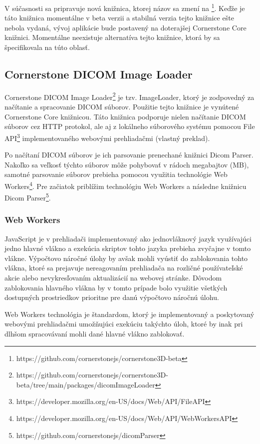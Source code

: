 V súčasnosti sa pripravuje nová  knižnica, ktorej názov sa zmení na \footnote{https://github.com/cornerstonejs/cornerstone3D-beta}. Keďže je táto knižnica momentálne v beta verzii a stabilná verzia tejto knižnice ešte nebola vydaná, vývoj aplikácie bude postavený na doterajšej Cornerstone Core knižnici.
Momentálne neexistuje alternatíva tejto knižnice, ktorá by sa špecifikovala na túto oblasť.

\subsection {Cornerstone DICOM Image Loader}
Cornerstone DICOM Image Loader\footnote{https://github.com/cornerstonejs/cornerstone3D-beta/tree/main/packages/dicomImageLoader} je tzv. ImageLoader, ktorý je zodpovedný za načítanie a spracovanie DICOM súborov. Použitie tejto knižnice je vynútené Cornerstone Core knižnicou. Táto knižnica podporuje nielen načítanie DICOM súborov cez HTTP protokol, ale aj z lokálneho súborového systému pomocou File API\footnote{https://developer.mozilla.org/en-US/docs/Web/API/File\textunderscore API} implementovaného webovými prehliadačmi \cite{about_cornerstone_dicom_image_loader} (vlastný preklad).

Po načítaní DICOM súborov je ich parsovanie prenechané knižnici Dicom Parser. Nakoľko sa veľkosť týchto súborov môže pohybovať v rádoch megabajtov (MB), samotné parsovanie súborov prebieha pomocou využitia technológie Web Workers\footnote{https://developer.mozilla.org/en-US/docs/Web/API/Web\textunderscore Workers\textunderscore API}. Pre začiatok priblížim technológiu Web Workers a následne knižnicu Dicom Parser\footnote{https://github.com/cornerstonejs/dicomParser}.

\subsubsection {Web Workers}
JavaScript je v prehliadači implementovaný ako jednovláknový jazyk využívajúci jedno hlavné vlákno a exekúcia skriptov tohto jazyka prebieha zvyčajne v tomto vlákne. Výpočtovo náročné úlohy by avšak mohli vyústiť do zablokovania tohto vlákna, ktoré sa prejavuje nereagovaním prehliadača na rozličné používateľské akcie alebo nevykresľovaním aktualizácií na webovej stránke. Dôvodom zablokovania hlavného vlákna by v tomto prípade bolo využitie všetkých dostupných prostriedkov prioritne pre danú výpočtovo náročnú úlohu.

Web Workers technológia je štandardom, ktorý je implementovaný a poskytovaný webovými prehliadačmi umožňujúci exekúciu takýchto úloh, ktoré by inak pri dlhšom spracovávaní mohli dané hlavné vlákno zablokovať.

